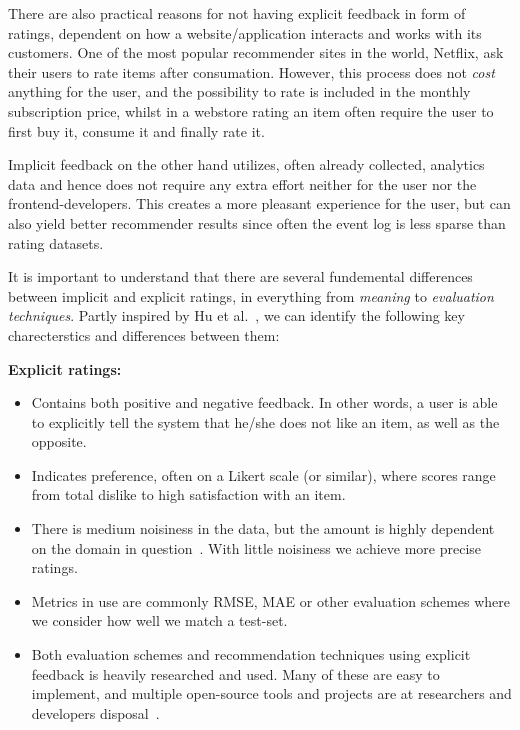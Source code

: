 There are also practical reasons for not having explicit feedback in form of
ratings, dependent on how a website/application interacts and works with its
customers. One of the most popular recommender sites in the world, Netflix, ask
their users to rate items after consumation. However, this process does not
\textit{cost} anything for the user, and the possibility to rate is included in
the monthly subscription price, whilst in a webstore rating an item often
require the user to first buy it, consume it and finally rate it.

Implicit feedback on the other hand utilizes, often already collected,
analytics data and hence does not require any extra effort neither for the user
nor the frontend-developers. This creates a more pleasant experience for the
user, but can also yield better recommender results since often the event log
is less sparse than rating datasets.

It is important to understand that there are several fundemental differences
between implicit and explicit ratings, in everything from \textit{meaning} to
\textit{evaluation techniques}. Partly inspired by Hu et al.~\cite{Hu2008}, we
can identify the following key charecterstics and differences between them:

\textbf{Explicit ratings:}
\begin{itemize}
\item Contains both positive and negative feedback. In other words, a user is
able to explicitly tell the system that he/she does not like an item, as well
as the opposite.
\item Indicates preference, often on a Likert scale (or similar), where scores
range from total dislike to high satisfaction with an item.
\item There is medium noisiness in the data, but the amount is highly dependent
on the domain in question~\cite{amatriain2009like}. With little noisiness we
achieve more precise ratings.
\item Metrics in use are commonly RMSE, MAE or other evaluation schemes where
we consider how well we match a test-set.
\item Both evaluation schemes and recommendation techniques using explicit
feedback is heavily researched and used. Many of these are easy to implement,
and multiple open-source tools and projects are at researchers and developers
disposal~\cite{something}.
\end{itemize}

